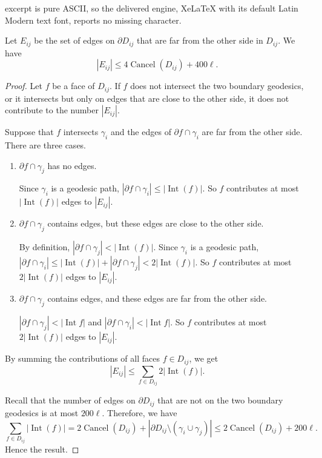 \documentclass[10pt,a4paper]{amsart}
\DeclareMathOperator{\Cancel}{Cancel}
\DeclareMathOperator{\Int}{Int}
\begin{document}
excerpt is pure ASCII, so the delivered engine, XeLaTeX with its default Latin Modern text font, reports no missing character.
\begin{lem} \label{lem estimation far from the other side}
    Let $E_{ij}$ be the set of edges on $\partial D_{ij}$ that are far from the other side in $D_{ij}$. We have
    \[|E_{ij}|\leq 4\Cancel(D_{ij}) + 400\ell.\]
\end{lem}

\begin{proof}
    Let $f$ be a face of $D_{ij}$. If $f$ does not intersect the two boundary geodesics, or it intersects but only on edges that are close to the other side, it does not contribute to the number $|E_{ij}|$.
    
    Suppose that $f$ intersects $\gamma_i$ and the edges of $\partial f \cap \gamma_i$ are far from the other side. There are three cases.
    
    \begin{enumerate}[{Case} 1.]
        \item $\partial f\cap \gamma_j$ has no edges.
        
        Since $\gamma_i$ is a geodesic path, $|\partial f \cap \gamma_i| \leq |\Int(f)|$. So $f$ contributes at most $|\Int(f)|$ edges to $|E_{ij}|$.

        \item $\partial f\cap \gamma_j$ contains edges, but these edges are close to the other side.

        By definition, $|\partial f \cap \gamma_j|<|\Int (f)|$. Since $\gamma_i$ is a geodesic path, $|\partial f \cap \gamma_i| \leq |\Int(f)| + |\partial f \cap \gamma_j| < 2|\Int(f)|$. So $f$ contributes at most $2|\Int(f)|$ edges to $|E_{ij}|$.
        
        \item $\partial f\cap \gamma_j$ contains edges, and these edges are far from the other side.

        $|\partial f \cap \gamma_j|<|\Int f|$ and $|\partial f \cap \gamma_i|<|\Int f|$. So $f$ contributes at most $2|\Int(f)|$ edges to $|E_{ij}|$.
    \end{enumerate}
    By summing the contributions of all faces $f\in D_{ij}$, we get \[|E_{ij}|\leq \sum_{f\in D_{ij}}2|\Int(f)|.\]
    
    Recall that the number of edges on $\partial D_{ij}$ that are not on the two boundary geodesics is at most $200\ell$. Therefore, we have
    \[\sum_{f\in D_{ij}}|\Int(f)| = 2\Cancel(D_{ij})+|\partial D_{ij}\setminus (\gamma_i\cup\gamma_j)| \leq 2\Cancel(D_{ij})+200\ell .\]
    Hence the result.

\end{proof}
\end{document}
